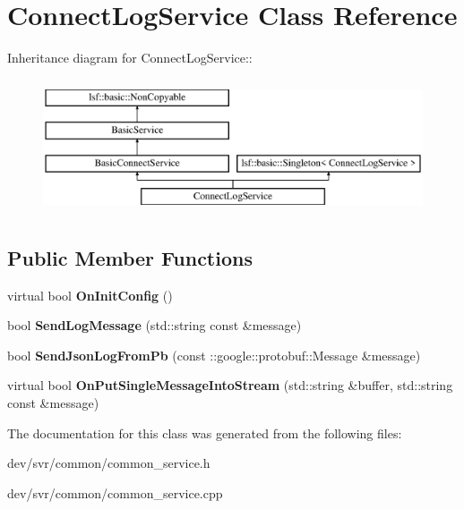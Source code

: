 \hypertarget{classConnectLogService}{
\section{ConnectLogService Class Reference}
\label{classConnectLogService}
}
Inheritance diagram for ConnectLogService::\begin{figure}[H]
\begin{center}
\leavevmode
\includegraphics[height=4cm]{classConnectLogService}
\end{center}
\end{figure}
\subsection*{Public Member Functions}
\begin{DoxyCompactItemize}
\item 
\hypertarget{classConnectLogService_af2bfc1b2aeae48e04100be8a03913227}{
virtual bool {\bfseries OnInitConfig} ()}
\label{classConnectLogService_af2bfc1b2aeae48e04100be8a03913227}

\item 
\hypertarget{classConnectLogService_a2fba9d108fdc3f97b567804495eeddac}{
bool {\bfseries SendLogMessage} (std::string const \&message)}
\label{classConnectLogService_a2fba9d108fdc3f97b567804495eeddac}

\item 
\hypertarget{classConnectLogService_a586e2aca749cad9bc248902e63aa90a5}{
bool {\bfseries SendJsonLogFromPb} (const ::google::protobuf::Message \&message)}
\label{classConnectLogService_a586e2aca749cad9bc248902e63aa90a5}

\item 
\hypertarget{classConnectLogService_abf3e08880207ff4b18f6ca6adf7b8719}{
virtual bool {\bfseries OnPutSingleMessageIntoStream} (std::string \&buffer, std::string const \&message)}
\label{classConnectLogService_abf3e08880207ff4b18f6ca6adf7b8719}

\end{DoxyCompactItemize}


The documentation for this class was generated from the following files:\begin{DoxyCompactItemize}
\item 
dev/svr/common/common\_\-service.h\item 
dev/svr/common/common\_\-service.cpp\end{DoxyCompactItemize}
